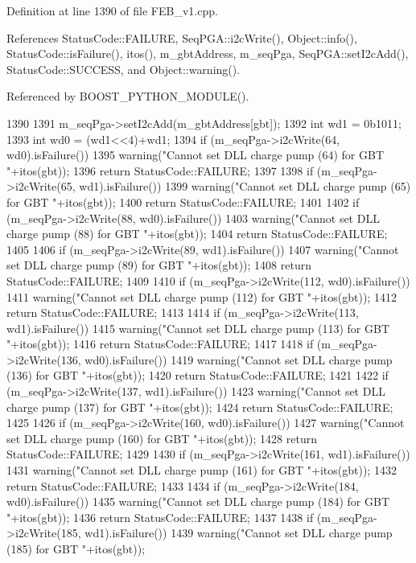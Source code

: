 Definition at line 1390 of file FEB\_\-v1.cpp.

References StatusCode::FAILURE, SeqPGA::i2cWrite(), Object::info(), StatusCode::isFailure(), itos(), m\_\-gbtAddress, m\_\-seqPga, SeqPGA::setI2cAdd(), StatusCode::SUCCESS, and Object::warning().

Referenced by BOOST\_\-PYTHON\_\-MODULE().


\begin{DoxyCode}
1390                                         {
1391   m_seqPga->setI2cAdd(m_gbtAddress[gbt]);
1392   int wd1 = 0b1011;
1393   int wd0 = (wd1<<4)+wd1;
1394   if (m_seqPga->i2cWrite(64, wd0).isFailure()){
1395     warning("Cannot set DLL charge pump (64) for GBT "+itos(gbt));
1396     return StatusCode::FAILURE;
1397   }
1398   if (m_seqPga->i2cWrite(65, wd1).isFailure()){
1399     warning("Cannot set DLL charge pump (65) for GBT "+itos(gbt));
1400     return StatusCode::FAILURE;
1401   }
1402   if (m_seqPga->i2cWrite(88, wd0).isFailure()){
1403     warning("Cannot set DLL charge pump (88) for GBT "+itos(gbt));
1404     return StatusCode::FAILURE;
1405   }
1406   if (m_seqPga->i2cWrite(89, wd1).isFailure()){
1407     warning("Cannot set DLL charge pump (89) for GBT "+itos(gbt));
1408     return StatusCode::FAILURE;
1409   }
1410   if (m_seqPga->i2cWrite(112, wd0).isFailure()){
1411     warning("Cannot set DLL charge pump (112) for GBT "+itos(gbt));
1412     return StatusCode::FAILURE;
1413   }
1414   if (m_seqPga->i2cWrite(113, wd1).isFailure()){
1415     warning("Cannot set DLL charge pump (113) for GBT "+itos(gbt));
1416     return StatusCode::FAILURE;
1417   }
1418   if (m_seqPga->i2cWrite(136, wd0).isFailure()){
1419     warning("Cannot set DLL charge pump (136) for GBT "+itos(gbt));
1420     return StatusCode::FAILURE;
1421   }
1422   if (m_seqPga->i2cWrite(137, wd1).isFailure()){
1423     warning("Cannot set DLL charge pump (137) for GBT "+itos(gbt));
1424     return StatusCode::FAILURE;
1425   }
1426   if (m_seqPga->i2cWrite(160, wd0).isFailure()){
1427     warning("Cannot set DLL charge pump (160) for GBT "+itos(gbt));
1428     return StatusCode::FAILURE;
1429   }
1430   if (m_seqPga->i2cWrite(161, wd1).isFailure()){
1431     warning("Cannot set DLL charge pump (161) for GBT "+itos(gbt));
1432     return StatusCode::FAILURE;
1433   }
1434   if (m_seqPga->i2cWrite(184, wd0).isFailure()){
1435     warning("Cannot set DLL charge pump (184) for GBT "+itos(gbt));
1436     return StatusCode::FAILURE;
1437   }
1438   if (m_seqPga->i2cWrite(185, wd1).isFailure()){
1439     warning("Cannot set DLL charge pump (185) for GBT "+itos(gbt));
}}
\end{DoxyCode}
